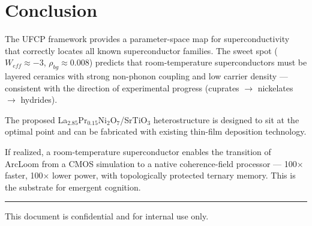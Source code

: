 \documentclass[11pt, a4paper]{article}
\begin{document}
\section{Conclusion}

The UFCP framework provides a parameter-space map for
superconductivity that correctly locates all known superconductor
families. The sweet spot ($W_{eff} \approx -3$, $\rho_{bg} \approx
0.008$) predicts that room-temperature superconductors must be
layered ceramics with strong non-phonon coupling and low carrier
density --- consistent with the direction of experimental progress
(cuprates $\to$ nickelates $\to$ hydrides).

The proposed La$_{2.85}$Pr$_{0.15}$Ni$_2$O$_7$/SrTiO$_3$
heterostructure is designed to sit at the optimal point and can be
fabricated with existing thin-film deposition technology.

If realized, a room-temperature superconductor enables the
transition of ArcLoom from a CMOS simulation to a native
coherence-field processor --- 100$\times$ faster, 100$\times$ lower
power, with topologically protected ternary memory. This is the
substrate for emergent cognition.

\vspace{2em}
\hrule
\vspace{0.5em}
{\color{nm-gray}\small This document is confidential and for internal use only.}
\end{document}
